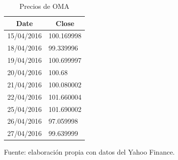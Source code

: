 \begin{table}[h]
\centering
\caption{Precios de OMA}
\label{tab:OMA}
\begin{tabular}{ll}
\multicolumn{1}{c}{\textbf{Date}} & \multicolumn{1}{c}{\textbf{Close}} \\ \hline
15/04/2016                        & 100.169998                         \\
18/04/2016                        & 99.339996                          \\
19/04/2016                        & 100.699997                         \\
20/04/2016                        & 100.68                             \\
21/04/2016                        & 100.080002                         \\
22/04/2016                        & 101.660004                         \\
25/04/2016                        & 101.690002                         \\
26/04/2016                        & 97.059998                          \\
27/04/2016                        & 99.639999                         
\end{tabular}
\begin{tablenotes}
\centering
\item Fuente: elaboración propia con datos del Yahoo Finance.
\end{tablenotes}
\end{table}
